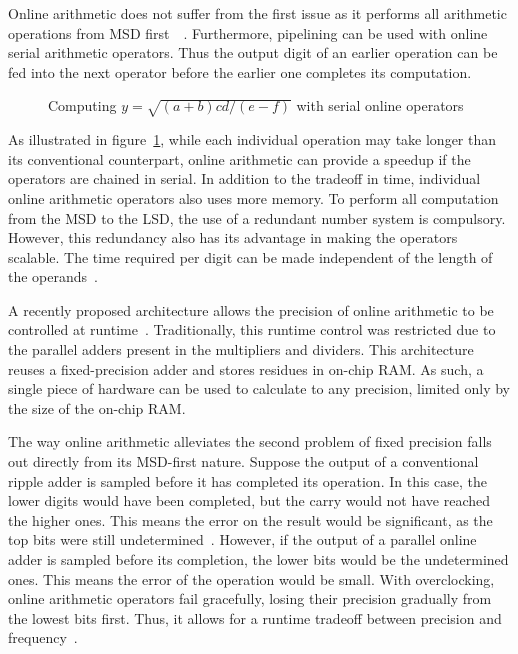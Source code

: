 Online arithmetic does not suffer from the first issue as it performs all arithmetic operations from MSD first~\cite{Ercegovac1}~\cite{Ercegovac2}.
Furthermore, pipelining can be used with online serial arithmetic operators.
Thus the output digit of an earlier operation can be fed into the next operator before the earlier one completes its computation.

\begin{figure}[H]
  \centering
  
  \caption{Computing $y=\sqrt{(a+b)cd/(e-f)}$ with serial online operators~\cite{Ercegovac1}}
  \label{Online}
\end{figure}

As illustrated in figure~\ref{Online}, while each individual operation may take longer than its conventional counterpart, online arithmetic can provide a speedup if the operators are chained in serial.
In addition to the tradeoff in time, individual online arithmetic operators also uses more memory.
To perform all computation from the MSD to the LSD, the use of a redundant number system is compulsory.
However, this redundancy also has its advantage in making the operators scalable.
The time required per digit can be made independent of the length of the operands~\cite{Trivedi1}.

A recently proposed architecture allows the precision of online arithmetic to be controlled at runtime~\cite{Zhao1}.
Traditionally, this runtime control was restricted due to the parallel adders present in the multipliers and dividers.
This architecture reuses a fixed-precision adder and stores residues in on-chip RAM.
As such, a single piece of hardware can be used to calculate to any precision, limited only by the size of the on-chip RAM.

The way online arithmetic alleviates the second problem of fixed precision falls out directly from its MSD-first nature.
Suppose the output of a conventional ripple adder is sampled before it has completed its operation.
In this case, the lower digits would have been completed, but the carry would not have reached the higher ones.
This means the error on the result would be significant, as the top bits were still undetermined~\cite{Shi1}.
However, if the output of a parallel online adder is sampled before its completion, the lower bits would be the undetermined ones.
This means the error of the operation would be small.
With overclocking, online arithmetic operators fail gracefully, losing their precision gradually from the lowest bits first.
Thus, it allows for a runtime tradeoff between precision and frequency~\cite{Shi2}.

